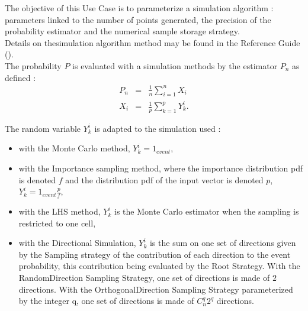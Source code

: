 \renewcommand{\filename}{docUC_ThresholdExceedance_SimulationAlgoParametrization.tex}
\renewcommand{\filetitle}{UC : Parametrization of a simulation algorithm}

\HeaderIIILevel

\label{simuParam}



The objective of this Use Case is to parameterize a simulation algorithm : parameters linked to the number of points generated, the precision of the probability estimator and the numerical sample storage strategy.\\

Details on thesimulation algorithm method may be found in the Reference Guide ().\\

The probability $P$ is evaluated with a simulation methods by the estimator $P_n$ as defined :
\begin{eqnarray}
  P_n & = & \displaystyle \frac{1}{n} \sum_{i=1}^{n} X_i\\
  X_i & = & \displaystyle \frac{1}{p} \sum_{k=1}^{p} Y_k^i.
\end{eqnarray}

The random variable $Y_k^i$ is adapted to the simulation used :
\begin{itemize}
\item with the Monte Carlo method, $Y_k^i = 1_{event}$,
\item with the Importance sampling method, where the importance distribution pdf is denoted  $f$ and the distribution pdf of the input vector is denoted $p$, $Y_k^i = 1_{event}\frac{p}{f}$,
\item with the LHS method, $Y_k^i$ is the Monte Carlo estimator when the sampling is restricted to one cell,
\item with the Directional Simulation, $Y_k^i$ is the sum on one set of directions given by the Sampling strategy of the contribution of each direction to the event probability, this contribution being evaluated by the Root Strategy. With the RandomDirection Sampling Strategy, one set of directions is made of $2$ directions. With the OrthogonalDirection Sampling Strategy parameterized by the integer q, one set of directions is made of $C_n^q 2^q$ directions.
\end{itemize}
\vspace*{0.5cm}


